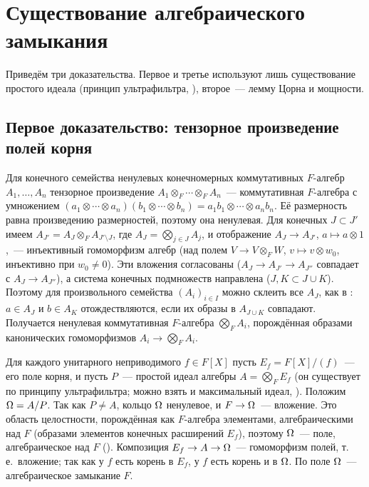 \section{Существование алгебраического замыкания}

Приведём три доказательства. Первое и третье используют лишь существование простого идеала (принцип ультрафильтра,
), второе~--- лемму Цорна и мощности.

\subsection*{Первое доказательство: тензорное произведение полей корня}

Для конечного семейства ненулевых конечномерных коммутативных $F$-алгебр $A_1,\dots,A_n$ тензорное произведение
$A_1\otimes_F\cdots\otimes_FA_n$~--- коммутативная $F$-алгебра с умножением
$(a_1\otimes\cdots\otimes a_n)(b_1\otimes\cdots\otimes b_n)=a_1b_1\otimes\cdots\otimes a_nb_n$. Её размерность равна
произведению размерностей, поэтому она ненулевая. Для конечных $J\subset J'$ имеем
$A_{J'}=A_J\otimes_FA_{J'\setminus J}$, где $A_J=\bigotimes_{j\in J}A_j$, и отображение $A_J\to A_{J'}$, $a\mapsto a\otimes1$,~---
инъективный гомоморфизм алгебр (над полем $V\to V\otimes_FW$, $v\mapsto v\otimes w_0$, инъективно при $w_0\ne0$). Эти
вложения согласованы ($A_J\to A_{J'}\to A_{J''}$ совпадает с $A_J\to A_{J''}$), а система конечных подмножеств направлена
($J,K\subset J\cup K$). Поэтому для произвольного семейства $(A_i)_{i\in I}$ можно склеить все $A_J$, как в :
$a\in A_J$ и $b\in A_K$ отождествляются, если их образы в $A_{J\cup K}$ совпадают. Получается ненулевая коммутативная
$F$-алгебра $\bigotimes_FA_i$, порождённая образами канонических гомоморфизмов $A_i\to\bigotimes_FA_i$.

Для каждого унитарного неприводимого $f\in F[X]$ пусть $E_f=F[X]/(f)$~--- его поле корня, и пусть $P$~--- простой
идеал алгебры $A=\bigotimes_FE_f$ (он существует по принципу ультрафильтра; можно взять и максимальный идеал, ).
Положим $\Omega=A/P$. Так как $P\ne A$, кольцо $\Omega$ ненулевое, и $F\to\Omega$~--- вложение. Это область целостности,
порождённая как $F$-алгебра элементами, алгебраическими над $F$ (образами элементов конечных расширений $E_f$), поэтому
$\Omega$~--- поле, алгебраическое над $F$ (). Композиция
$E_f\to A\to\Omega$~--- гомоморфизм полей, т.\,е.\ вложение; так как у $f$ есть корень в $E_f$, у $f$ есть корень и в
$\Omega$. По  поле $\Omega$~--- алгебраическое замыкание $F$.

